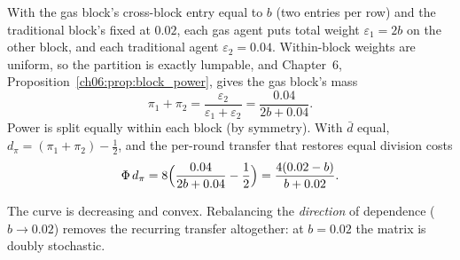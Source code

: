 \documentclass[../solutions_manual.tex]{subfiles}
\begin{document}
 With the gas block's cross-block entry equal to $b$ (two entries per row) and the traditional block's fixed at $0.02$, each gas agent puts total weight $\varepsilon_1 = 2b$ on the other block, and each traditional agent $\varepsilon_2 = 0.04$. Within-block weights are uniform, so the partition is exactly lumpable, and Chapter~6, Proposition~\ref{ch06:prop:block_power}, gives the gas block's mass
\[
\pi_1 + \pi_2 = \frac{\varepsilon_2}{\varepsilon_1 + \varepsilon_2} = \frac{0.04}{2b + 0.04}.
\]
Power is split equally within each block (by symmetry). With $\bar d$ equal, $d_\pi = (\pi_1 + \pi_2) - \frac12$, and the per-round transfer that restores equal division costs
\[
\Phi\, d_\pi = 8\Bigl(\frac{0.04}{2b+0.04} - \frac12\Bigr) = \frac{4(0.02 - b)}{b + 0.02}.
\]
\begin{center}
\end{center}
\begin{center}
\end{center}
The curve is decreasing and convex. Rebalancing the \emph{direction} of dependence ($b \to 0.02$) removes the recurring transfer altogether: at $b = 0.02$ the matrix is doubly stochastic.
\end{document}
